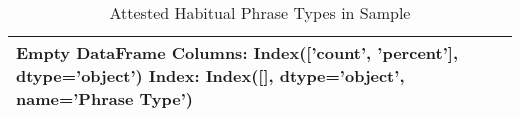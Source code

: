 \begin{table}[htbp!]
\centering
\caption{Attested Habitual Phrase Types in Sample}
\label{table:hab_phtype_ct}
\begin{tabular}{lrl}
\toprule
Empty DataFrame
Columns: Index(['count', 'percent'], dtype='object')
Index: Index([], dtype='object', name='Phrase Type') \\
\bottomrule
\end{tabular}
\end{table}
